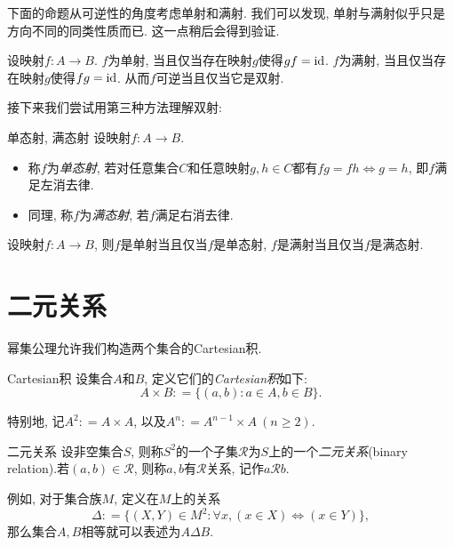 下面的命题从可逆性的角度考虑单射和满射. 我们可以发现, 单射与满射似乎只是方向不同的同类性质而已. 这一点稍后会得到验证. 

\begin{proposition}{}
	设映射$f: A \to B$. $f$为单射, 当且仅当存在映射$g$使得$gf=\mathrm{id}$. $f$为满射, 当且仅当存在映射$g$使得$fg=\mathrm{id}$. 从而$f$可逆当且仅当它是双射.
\end{proposition}

接下来我们尝试用第三种方法理解双射: 

\begin{definition}{单态射, 满态射}
	设映射$f:A \to B$. 
	\begin{itemize}
		\item 称$f$为\textit{单态射}, 若对任意集合$C$和任意映射$g,h \in C$都有$fg=fh \Leftrightarrow g=h$, 即$f$满足左消去律. 
		\item 同理, 称$f$为\textit{满态射}, 若$f$满足右消去律. 
	\end{itemize}
\end{definition}

\begin{proposition}{} %
	设映射$f:A \to B$, 则$f$是单射当且仅当$f$是单态射, $f$是满射当且仅当$f$是满态射. 
\end{proposition}

\section{二元关系}

幂集公理允许我们构造两个集合的Cartesian积.

\begin{definition}{Cartesian积}
	设集合$A$和$B$, 定义它们的\textit{Cartesian积}如下: $$A \times B : = \{ (a, b): a \in A, b \in B \}.$$
\end{definition}
\begin{remark}
	特别地, 记$A^2: =A \times A$, 以及$A^n : = A^{n-1} \times A~(n \geq 2)$.
\end{remark}

\begin{definition}{二元关系}
	设非空集合$S$, 则称$S^2$的一个子集$\mathcal{R}$为$S$上的一个\textit{二元关系}(binary relation).若$(a, b) \in \mathcal{R}$, 则称$a, b$有$\mathcal{R}$关系, 记作$a\mathcal{R}b$.
\end{definition}

例如, 对于集合族$M$, 定义在$M$上的关系$$\Delta : = \{ (X, Y) \in M^2 :  \forall x, (x \in X) \Leftrightarrow (x \in Y) \}, $$
那么集合$A, B$相等就可以表述为$A \Delta B$.

